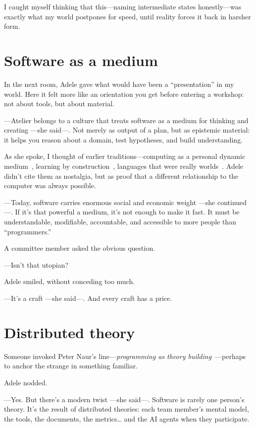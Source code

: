 \documentclass[11pt,a4paper]{article}
\begin{document}
I caught myself thinking that this---naming intermediate states
honestly---was exactly what my world postpones for speed, until reality
forces it back in harsher form.

\section{Software as a medium}

In the next room, Adele gave what would have been a ``presentation'' in my
world. Here it felt more like an orientation you get before entering a
workshop: not about tools, but about material.

---Atelier belongs to a culture that treats software as a medium for thinking
and creating ---she said---. Not merely as output of a plan, but as epistemic
material: it helps you reason about a domain, test hypotheses, and build
understanding.

As she spoke, I thought of earlier traditions---computing as a personal
dynamic medium~\cite{kay}, learning by construction~\cite{constructionism},
languages that were really worlds~\cite{ingalls}. Adele didn't cite them as
nostalgia, but as proof that a different relationship to the computer was
always possible.

---Today, software carries enormous social and economic weight ---she
continued---. If it's that powerful a medium, it's not enough to make it
fast. It must be understandable, modifiable, accountable, and accessible to
more people than ``programmers.''

A committee member asked the obvious question.

---Isn't that utopian?

Adele smiled, without conceding too much.

---It's a craft ---she said---. And every craft has a price.

\section{Distributed theory}

Someone invoked Peter Naur's line---\emph{programming as theory
building}~\cite{naur}---perhaps to anchor the strange in something familiar.

Adele nodded.

---Yes. But there's a modern twist ---she said---. Software is rarely one
person's theory. It's the result of distributed theories: each team member's
mental model, the tools, the documents, the metrics\ldots{} and the AI agents
when they participate.
\end{document}

